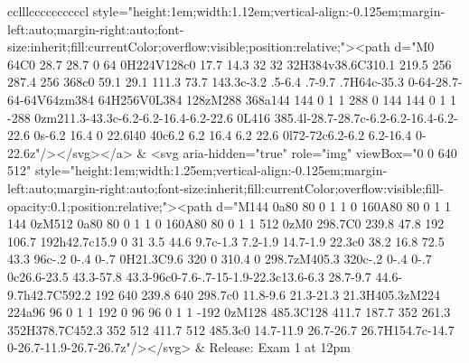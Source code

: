 \documentclass[
]{article}
\begin{document}
\begin{figure*}
\begin{longtable*}{cclllccccccccccl}
style="height:1em;width:1.12em;vertical-align:-0.125em;margin-left:auto;margin-right:auto;font-size:inherit;fill:currentColor;overflow:visible;position:relative;"><path d="M0 64C0 28.7 28.7 0 64 0H224V128c0 17.7 14.3 32 32 32H384v38.6C310.1 219.5 256 287.4 256 368c0 59.1 29.1 111.3 73.7 143.3c-3.2 .5-6.4 .7-9.7 .7H64c-35.3 0-64-28.7-64-64V64zm384 64H256V0L384 128zM288 368a144 144 0 1 1 288 0 144 144 0 1 1 -288 0zm211.3-43.3c-6.2-6.2-16.4-6.2-22.6 0L416 385.4l-28.7-28.7c-6.2-6.2-16.4-6.2-22.6 0s-6.2 16.4 0 22.6l40 40c6.2 6.2 16.4 6.2 22.6 0l72-72c6.2-6.2 6.2-16.4 0-22.6z"/></svg></a> & <svg aria-hidden="true" role="img" viewBox="0 0 640 512" style="height:1em;width:1.25em;vertical-align:-0.125em;margin-left:auto;margin-right:auto;font-size:inherit;fill:currentColor;overflow:visible;fill-opacity:0.1;position:relative;"><path d="M144 0a80 80 0 1 1 0 160A80 80 0 1 1 144 0zM512 0a80 80 0 1 1 0 160A80 80 0 1 1 512 0zM0 298.7C0 239.8 47.8 192 106.7 192h42.7c15.9 0 31 3.5 44.6 9.7c-1.3 7.2-1.9 14.7-1.9 22.3c0 38.2 16.8 72.5 43.3 96c-.2 0-.4 0-.7 0H21.3C9.6 320 0 310.4 0 298.7zM405.3 320c-.2 0-.4 0-.7 0c26.6-23.5 43.3-57.8 43.3-96c0-7.6-.7-15-1.9-22.3c13.6-6.3 28.7-9.7 44.6-9.7h42.7C592.2 192 640 239.8 640 298.7c0 11.8-9.6 21.3-21.3 21.3H405.3zM224 224a96 96 0 1 1 192 0 96 96 0 1 1 -192 0zM128 485.3C128 411.7 187.7 352 261.3 352H378.7C452.3 352 512 411.7 512 485.3c0 14.7-11.9 26.7-26.7 26.7H154.7c-14.7 0-26.7-11.9-26.7-26.7z"/></svg> & Release: Exam 1 at 12pm \\ 

\end{longtable*}
\end{figure*}
\end{document}

